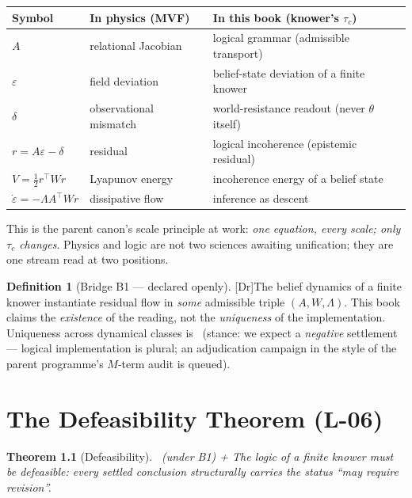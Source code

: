 \documentclass[11pt,a4paper,twoside]{book}
\newcommand{\tier}[1]{\textnormal{\small\textsf{[#1]}}}
\newcommand{\Dr}{\tier{Dr}}\newcommand{\Cj}{\tier{Cj}}\newcommand{\Wf}{\tier{Wf}}
\theoremstyle{plain}
\newtheorem{theorem}{Theorem}[chapter]
\theoremstyle{definition}
\newtheorem{definition}[theorem]{Definition}
\theoremstyle{remark}
\begin{document}
\begin{center}
\begin{tabular}{@{}lll@{}}
\toprule
Symbol & In physics (MVF) & In this book (knower's $\tau_c$)\\
\midrule
$A$ & relational Jacobian & logical grammar (admissible transport)\\
$\varepsilon$ & field deviation & belief-state deviation of a finite knower\\
$\delta$ & observational mismatch & world-resistance readout (never $\theta$ itself)\\
$r=A\varepsilon-\delta$ & residual & logical incoherence (epistemic residual)\\
$V=\tfrac12 r^{\!\top}Wr$ & Lyapunov energy & incoherence energy of a belief state\\
$\dot\varepsilon=-\Lambda A^{\!\top}Wr$ & dissipative flow & inference as descent\\
\bottomrule
\end{tabular}
\end{center}

This is the parent canon's scale principle at work: \emph{one equation, every
scale; only $\tau_c$ changes}. Physics and logic are not two sciences awaiting
unification; they are one stream read at two positions.

\begin{definition}[Bridge B1 --- declared openly]\Dr\label{def:B1}
The belief dynamics of a finite knower instantiate residual flow in \emph{some}
admissible triple $(A,W,\Lambda)$. This book claims the \emph{existence} of the
reading, not the \emph{uniqueness} of the implementation. Uniqueness across
dynamical classes is \OpenT\ (stance: we expect a \emph{negative} settlement
--- logical implementation is plural; an adjudication campaign in the style of
the parent programme's $M$-term audit is queued).
\end{definition}

\chapter{The Defeasibility Theorem (L-06)}

\begin{theorem}[Defeasibility]\Thstar\ (under B1) + \fd\label{th:defeasible}
The logic of a finite knower must be defeasible: every settled conclusion
structurally carries the status ``may require revision''.
\end{theorem}
\end{document}

